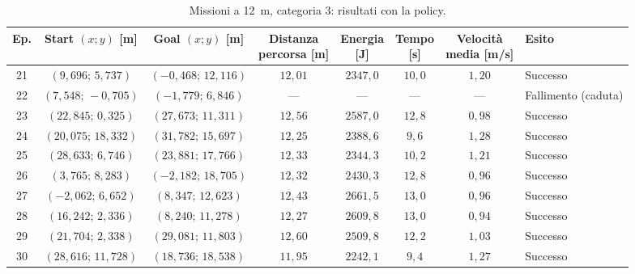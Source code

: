 \begin{table}[H]
\centering
\caption{Missioni a 12~m, categoria 3: risultati con la policy.}
\label{tab:big-map-12m-cat3}
\begingroup
\fontsize{9}{11}\selectfont
\setlength{\tabcolsep}{2.5pt}
\renewcommand{\arraystretch}{1.2}
\begin{tabular}{@{}c cc cccc l@{}}
\toprule
Ep. & \shortstack{Start $(x;y)$\\{}[m]} & \shortstack{Goal $(x;y)$\\{}[m]} & \shortstack{Distanza\\percorsa [m]} & \shortstack{Energia\\{}[J]} & \shortstack{Tempo\\{}[s]} & \shortstack{Velocità\\media [m/s]} & Esito \\
\midrule
21 & $(9{,}696;\,5{,}737)$ & $(-0{,}468;\,12{,}116)$ & $12{,}01$ & $2347{,}0$ & $10{,}0$ & $1{,}20$ & Successo \\
22 & $(7{,}548;\,-0{,}705)$ & $(-1{,}779;\,6{,}846)$ & --- & --- & --- & --- & Fallimento (caduta) \\
23 & $(22{,}845;\,0{,}325)$ & $(27{,}673;\,11{,}311)$ & $12{,}56$ & $2587{,}0$ & $12{,}8$ & $0{,}98$ & Successo \\
24 & $(20{,}075;\,18{,}332)$ & $(31{,}782;\,15{,}697)$ & $12{,}25$ & $2388{,}6$ & $9{,}6$ & $1{,}28$ & Successo \\
25 & $(28{,}633;\,6{,}746)$ & $(23{,}881;\,17{,}766)$ & $12{,}33$ & $2344{,}3$ & $10{,}2$ & $1{,}21$ & Successo \\
26 & $(3{,}765;\,8{,}283)$ & $(-2{,}182;\,18{,}705)$ & $12{,}32$ & $2430{,}3$ & $12{,}8$ & $0{,}96$ & Successo \\
27 & $(-2{,}062;\,6{,}652)$ & $(8{,}347;\,12{,}623)$ & $12{,}43$ & $2661{,}5$ & $13{,}0$ & $0{,}96$ & Successo \\
28 & $(16{,}242;\,2{,}336)$ & $(8{,}240;\,11{,}278)$ & $12{,}27$ & $2609{,}8$ & $13{,}0$ & $0{,}94$ & Successo \\
29 & $(21{,}704;\,2{,}338)$ & $(29{,}081;\,11{,}803)$ & $12{,}60$ & $2509{,}8$ & $12{,}2$ & $1{,}03$ & Successo \\
30 & $(28{,}616;\,11{,}728)$ & $(18{,}736;\,18{,}538)$ & $11{,}95$ & $2242{,}1$ & $9{,}4$ & $1{,}27$ & Successo \\
\bottomrule
\end{tabular}
\endgroup
\end{table}

